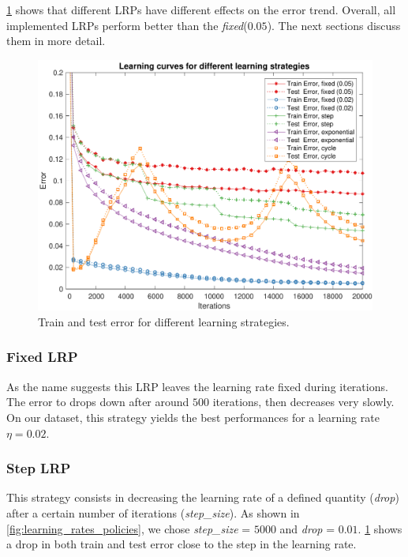 \cref{fig:lrp_training_error} shows that different \ac{LRPs} have different effects on the error trend.
Overall, all implemented \ac{LRPs} perform better than the \textit{fixed}($0.05$).
The next sections discuss them in more detail.

\begin{figure}
	\centering
	\includegraphics[width=\columnwidth]{figures/error_strategies}
	\caption{Train and test error for different learning strategies.}
	\label{fig:lrp_training_error}
\end{figure}

\subsubsection{Fixed \ac{LRP}}
As the name suggests this \ac{LRP} leaves the learning rate fixed during iterations.
The error to drops down after around $500$ iterations, then decreases very slowly. 
On our dataset, this strategy yields the best performances for a learning rate $\eta = 0.02$.

\subsubsection{Step \ac{LRP}}
This strategy consists in decreasing the learning rate of a defined quantity (\textit{drop}) after a certain number of iterations (\textit{step\_size}).
As shown in \cref{fig:learning_rates_policies}, we chose \textit{step\_size} = $5000$ and \textit{drop} = $0.01$.
\cref{fig:lrp_training_error} shows a drop in both train and test error close to the step in the learning rate.


